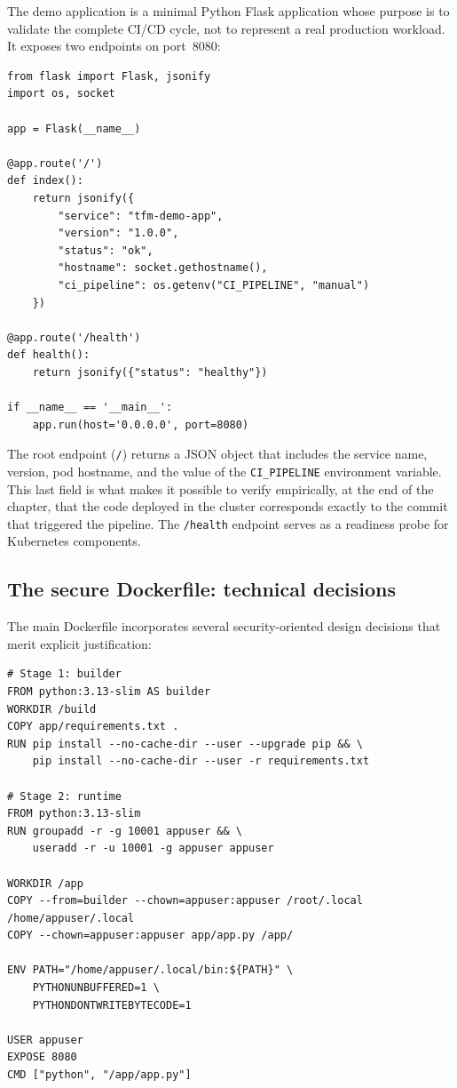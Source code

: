The demo application is a minimal Python Flask application whose purpose is to validate the complete CI/CD cycle, not to represent a real production workload. It exposes two endpoints on port~8080:

\begin{lstlisting}
from flask import Flask, jsonify
import os, socket

app = Flask(__name__)

@app.route('/')
def index():
    return jsonify({
        "service": "tfm-demo-app",
        "version": "1.0.0",
        "status": "ok",
        "hostname": socket.gethostname(),
        "ci_pipeline": os.getenv("CI_PIPELINE", "manual")
    })

@app.route('/health')
def health():
    return jsonify({"status": "healthy"})

if __name__ == '__main__':
    app.run(host='0.0.0.0', port=8080)
\end{lstlisting}

The root endpoint (\texttt{/}) returns a JSON object that includes the service name, version, pod hostname, and the value of the \texttt{CI\_PIPELINE} environment variable. This last field is what makes it possible to verify empirically, at the end of the chapter, that the code deployed in the cluster corresponds exactly to the commit that triggered the pipeline. The \texttt{/health} endpoint serves as a readiness probe for Kubernetes components.

\subsection{The secure Dockerfile: technical decisions}

The main Dockerfile incorporates several security-oriented design decisions that merit explicit justification:

\begin{lstlisting}
# Stage 1: builder
FROM python:3.13-slim AS builder
WORKDIR /build
COPY app/requirements.txt .
RUN pip install --no-cache-dir --user --upgrade pip && \
    pip install --no-cache-dir --user -r requirements.txt

# Stage 2: runtime
FROM python:3.13-slim
RUN groupadd -r -g 10001 appuser && \
    useradd -r -u 10001 -g appuser appuser

WORKDIR /app
COPY --from=builder --chown=appuser:appuser /root/.local /home/appuser/.local
COPY --chown=appuser:appuser app/app.py /app/

ENV PATH="/home/appuser/.local/bin:${PATH}" \
    PYTHONUNBUFFERED=1 \
    PYTHONDONTWRITEBYTECODE=1

USER appuser
EXPOSE 8080
CMD ["python", "/app/app.py"]
\end{lstlisting}

